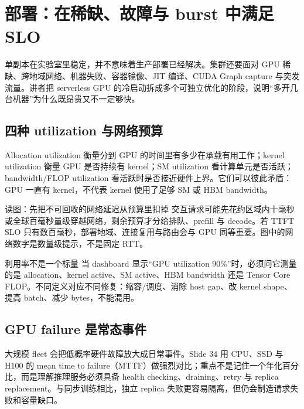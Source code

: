\section{部署：在稀缺、故障与 burst 中满足 SLO}

单副本在实验室里稳定，并不意味着生产部署已经解决。集群还要面对 GPU 稀缺、跨地域网络、机器失败、容器镜像、JIT 编译、CUDA Graph capture 与突发流量。讲者把 serverless GPU 的冷启动拆成多个可独立优化的阶段，说明“多开几台机器”为什么既昂贵又不一定够快。

\subsection{四种 utilization 与网络预算}

Allocation utilization 衡量分到 GPU 的时间里有多少在承载有用工作；kernel utilization 衡量 GPU 是否持续有 kernel；SM utilization 看计算单元是否活跃；bandwidth/FLOP utilization 看活跃时是否接近硬件上界。它们可以彼此矛盾：GPU 一直有 kernel，不代表 kernel 使用了足够 SM 或 HBM bandwidth。


\begin{knowledgebox}{读图：先把不可回收的网络延迟从预算里扣掉}
交互请求可能先花约区域内十毫秒或全球百毫秒量级穿越网络，剩余预算才分给排队、prefill 与 decode。若 TTFT SLO 只有数百毫秒，部署地域、连接复用与路由会与 GPU 同等重要。图中的网络数字是数量级提示，不是固定 RTT。
\end{knowledgebox}

\begin{importantbox}{利用率不是一个标量}
当 dashboard 显示“GPU utilization 90\%”时，必须问它测量的是 allocation、kernel active、SM active、HBM bandwidth 还是 Tensor Core FLOP。不同定义对应不同修复：缩容/调度、消除 host gap、改 kernel shape、提高 batch、减少 bytes，不能混用。
\end{importantbox}

\subsection{GPU failure 是常态事件}

大规模 fleet 会把低概率硬件故障放大成日常事件。Slide 34 用 CPU、SSD 与 H100 的 mean time to failure（MTTF）做强烈对比；重点不是记住一个年化百分比，而是理解推理服务必须具备 health checking、draining、retry 与 replica replacement。与同步训练相比，独立 replica 失败更容易隔离，但仍会制造请求失败和容量缺口。

